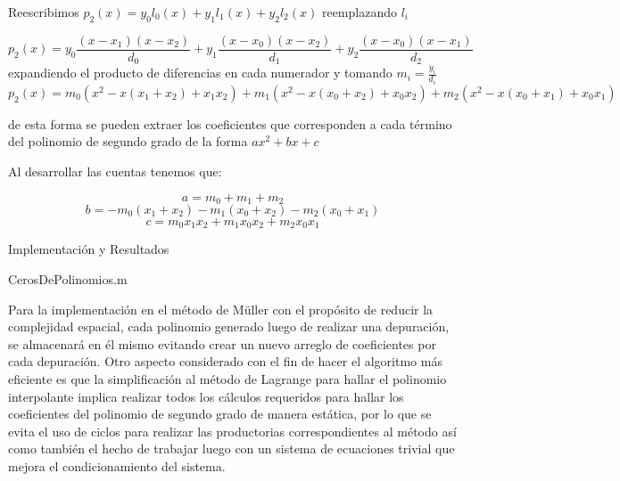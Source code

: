 \documentclass[11pt]{article}
\begin{document}
Reescribimos $p_2(x) = y_0l_0(x) + y_1l_1(x) + y_2l_2(x)$ reemplazando $l_i$

$$p_2(x) = y_0\frac{(x-x_1)(x-x_2)}{d_0} + y_1\frac{(x-x_0)(x-x_2)}{d_1} + y_2\frac{(x-x_0)(x-x_1)}{d_2}
$$
expandiendo el producto de diferencias en cada numerador y tomando $m_i = \frac{y_i}{d_i}$
$$
p_2(x) =  m_0(x^2 - x(x_1+x_2) + x_1x_2) + m_1(x^2 - x(x_0+x_2) + x_0x_2) + m_2(x^2 - x(x_0+x_1) + x_0x_1)$$

de esta forma se pueden extraer los coeficientes que corresponden a cada término del polinomio de segundo grado de la forma $ax^2 + bx + c$

Al desarrollar las cuentas tenemos que:

$$a = m_0 + m_1 + m_2$$
$$b = -m_0(x_1+x_2) - m_1(x_0+x_2) - m_2(x_0+x_1)$$ 
$$c =  m_0x_1x_2 + m_1x_0x_2 + m_2x_0x_1$$ 

\vspace{0.5cm}
\begin{center} \large  {Implementación y Resultados} \end{center}

\vspace{0.25cm}
\begin{tcolorbox}[colframe=blue!35!black, title=Código]
    CerosDePolinomios.m
\end{tcolorbox}
\vspace{0.5cm}

Para la implementación en el método de Müller con el propósito de reducir la complejidad espacial, cada polinomio generado luego de realizar una depuración, se almacenará en él mismo evitando crear un nuevo arreglo de coeficientes por cada depuración. Otro aspecto considerado con el fin de hacer el algoritmo más eficiente es que la simplificación al método de Lagrange para hallar el polinomio interpolante implica realizar todos los cálculos requeridos para hallar los coeficientes del polinomio de segundo grado de manera estática, por lo que se evita el uso de ciclos para realizar las productorias correspondientes al método así como también el hecho de trabajar luego con un sistema de ecuaciones trivial que mejora el condicionamiento del sistema.
\end{document}

